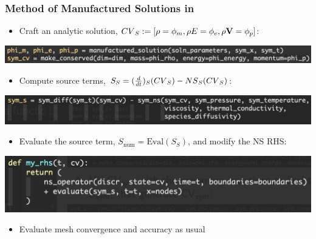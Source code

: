 \begin{frame}\frametitle{Method of Manufactured Solutions in \mirgecom{}}
\begin{itemize}
\item Craft an analytic solution, $\mathnormal{CV}_S: = \left[\rho=\phi_m, \rho{E}=\phi_e, \rho\mathbf{V}=\mathbf{\phi}_p\right]$:
\end{itemize}
\begin{center}
  \includegraphics[width=.6\textwidth]{Figures/mtc/CreateSymbolicSolution.png}
\end{center}
\begin{itemize}
\item Compute source terms, $S_S = (\frac{d}{\mathnormal{dt}})_S(\mathnormal{CV}_S) - \mathnormal{NS}_S(\mathnormal{CV}_S)$:
\end{itemize}
\begin{center}
  \includegraphics[width=.6\textwidth]{Figures/mtc/CalculateSymbolicSources.png}
\end{center}
\begin{itemize}
\item Evaluate the source term, $S_\text{num} = \text{Eval}(S_S)$, and modify the NS RHS: 
\end{itemize}
\begin{center}
  \includegraphics[width=.6\textwidth]{Figures/mtc/NumRHS.png}
\end{center}
\begin{itemize}
\item Evaluate mesh convergence and accuracy as usual
\end{itemize}
\begin{center}
  \begin{minipage}{.8\textwidth}

\end{minipage}
\end{center}
\end{frame}
